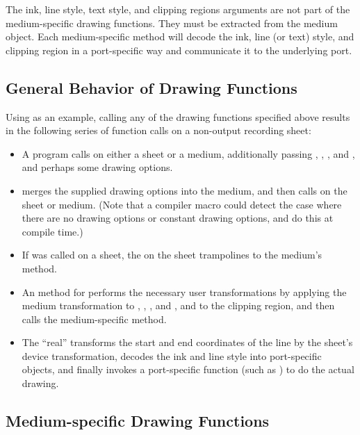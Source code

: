 The ink, line style, text style, and clipping regions arguments are not part of
the medium-specific drawing functions.  They must be extracted from the medium
object.  Each medium-specific method will decode the ink, line (or text) style,
and clipping region in a port-specific way and communicate it to the underlying
port.


\subsection {General Behavior of Drawing Functions}

Using  as an example, calling any of the drawing functions
specified above results in the following series of function calls on a
non-output recording sheet:

\begin{itemize}
\item A program calls  on either a sheet or a medium, additionally passing ,
, , and , and perhaps some drawing options.

\item {} merges the supplied drawing options into the medium, and
then calls  on the sheet or medium.  (Note that a compiler
macro could detect the case where there are no drawing options or constant
drawing options, and do this at compile time.)

\item If  was called on a sheet, the  on
the sheet trampolines to the medium's  method.

\item An  method for  performs the necessary
user transformations by applying the medium transformation to ,
, , and , and to the clipping region, and then calls the
medium-specific method.

\item The ``real''  transforms the start and end
coordinates of the line by the sheet's device transformation, decodes the ink
and line style into port-specific objects, and finally invokes a port-specific
function (such as ) to do the actual drawing.
\end{itemize}


\subsection {Medium-specific Drawing Functions}

